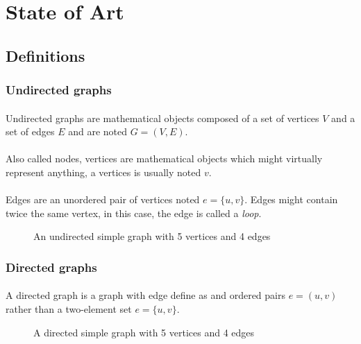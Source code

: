 \section{State of Art}

\subsection{Definitions}
\subsubsection{Undirected graphs}

\paragraph{}
Undirected graphs are mathematical objects composed of a set of vertices $V$
and a set of edges $E$ and are noted $G = (V,E)$.

\paragraph{}
Also called nodes, vertices are mathematical objects which might virtually
represent anything, a vertices is usually noted $v$.

\paragraph{}
Edges are an unordered pair of vertices noted $e = \{u,v\}$. Edges might
contain twice the same vertex, in this case, the edge is called a {\em loop}.

\begin{figure}[!h]
  \begin{center}
    
  \end{center}
  \caption{An undirected simple graph with 5 vertices and 4 edges}
\end{figure}

\subsubsection{Directed graphs}
\paragraph{} 
A directed graph is a graph with edge define as and ordered pairs $e = (u,v)$ rather than a two-element set $e = \{u,v\}$.
\begin{figure}[!h]
  \begin{center}
    
  \end{center}
  \caption{A directed simple graph with 5 vertices and 4 edges}
\end{figure}



